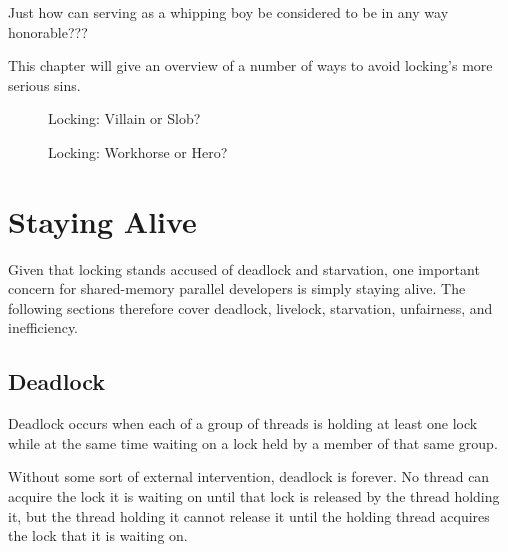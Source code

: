 \QuickQuiz{}
	Just how can serving as a whipping boy be considered to be
	in any way honorable???
 \QuickQuizEnd

This chapter will give an overview of a number of ways to avoid locking's
more serious sins.

\begin{figure}[tb]
\begin{center}
\end{center}
\caption{Locking: Villain or Slob?}
\end{figure}

\begin{figure}[tb]
\begin{center}
\end{center}
\caption{Locking: Workhorse or Hero?}
\end{figure}

\section{Staying Alive}
\label{sec:locking:Staying Alive}

Given that locking stands accused of deadlock and starvation,
one important concern for shared-memory parallel developers is
simply staying alive.
The following sections therefore cover deadlock, livelock, starvation,
unfairness, and inefficiency.

\subsection{Deadlock}
\label{sec:locking:Deadlock}

Deadlock occurs when each of a group of threads is holding at least one
lock while at the same time waiting on a lock held by a member
of that same group.

Without some sort of external intervention, deadlock is forever.
No thread can acquire the lock it is waiting on until that
lock is released by the thread holding it, but the thread holding
it cannot release it until the holding thread acquires the lock that
it is waiting on.

